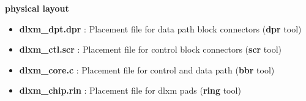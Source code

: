 \begin{center}
{\bf physical layout} 
\end{center}
\begin{itemize}
\item {\bf dlxm\_dpt.dpr} : Placement file for data path block
connectors ({\bf dpr} tool)
\item {\bf dlxm\_ctl.scr} : Placement file for control block connectors ({\bf scr} tool)
\item {\bf dlxm\_core.c}        : Placement file for control and data path ({\bf bbr} tool)
\item {\bf dlxm\_chip.rin}      : Placement file for dlxm pads ({\bf ring} tool)
\end{itemize}



